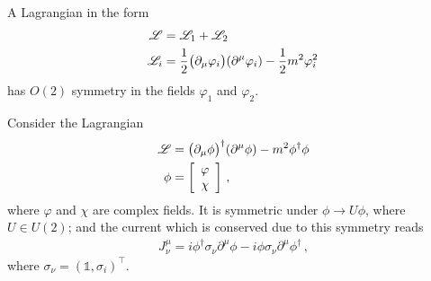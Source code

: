 \documentclass[main.tex]{subfiles}
\begin{document}
\begin{claim}
A Lagrangian in the form 
%
\begin{subequations}
\begin{align}
\mathscr{L} &= \mathscr{L}_{1} + \mathscr{L}_{2}  \\
\mathscr{L}_{i} &= \frac{1}{2} \qty(\partial_{\mu } \varphi_{i}) \qty(\partial^{\mu } \varphi_{i}) - \frac{1}{2} m^2 \varphi_{i}^2
\,
\end{align}
\end{subequations}
%
has \(O(2)\) symmetry in the fields \(\varphi_1 \) and \(\varphi_2 \).
\end{claim}

\begin{claim}
Consider the Lagrangian 
%
\begin{subequations}
\begin{align}
\mathscr{L} &= \qty(\partial_{\mu } \phi )^\dag \qty(\partial^{\mu } \phi ) - m^2 \phi ^\dag \phi  \\
\phi &= \left[\begin{array}{c}
\varphi  \\ 
\chi 
\end{array}\right]
\,,
\end{align}
\end{subequations}
%
where \(\varphi \) and \(\chi \) are complex fields.
It is symmetric under \(\phi \to U\phi \), where \(U \in U(2)\); and the current which is conserved due to this symmetry reads 
%
\begin{align}
J^{\mu }_{\nu } = i \phi ^\dag \sigma_{\nu } \partial^{\mu } \phi - i \phi \sigma_{\nu } \partial^{\mu } \phi ^\dag
\,,
\end{align}
%
where \(\sigma_{\nu } = (\mathbb{1}, \sigma_{i})^{\top}\).
\end{claim}
\end{document}
